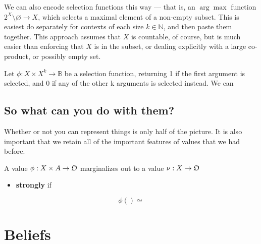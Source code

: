 \documentclass{article}
\begin{document}
	We can also encode selection functions this way --- that is, an $\arg\max$ function $2^{X} \setminus \varnothing \to X$, which selects a maximal element of a non-empty subset.  This is easiest do separately for contexts of each size $k \in \mathbb N$, and then paste them together. This approach assumes that $X$ is countable, of course, but is much easier than enforcing that $X$ is in the subset, or dealing explicitly with a large co-product, or possibly empty set. 
		
	\begin{example}
		Let $\phi : X \times X^k \to \mathbb B$ be a selection function, returning 1 if the first argument is selected, and 0 if any of the other k arguments is selected instead. We can 
	\end{example}
	
	
	
	
%	


	\subsection{So what can you do with them?}
	
	Whether or not you can represent things is only half of the picture. It is also important that we retain all of the important features of values that we had before. 
	
	\begin{defn}
		A value $\phi: X \times A \to \frak O$ marginalizes out to a value $\nu: X \to \frak O$ 
		
		\begin{itemize}
			\item \textbf{strongly} if 
		\end{itemize}
		\[ \phi() \simeq \]
	\end{defn}


	\section{Beliefs}
\end{document}
